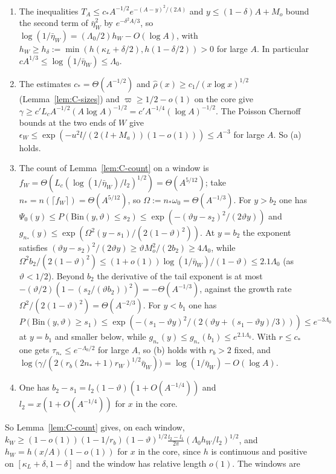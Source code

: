 \documentclass[10pt,letterpaper]{article}
\begin{document}
\begin{enumerate}
\item The inequalities $T_A\le c_*A^{-1/2}e^{-(A-y)^2/(2A)}$ and $y\le(1-\delta)A+M_o$ bound the second term of $\bar\eta_W^2$ by $e^{-\delta^2A/3}$,
so $\log(1/\bar\eta_W)=(\Lambda_0/2)h_W-O(\log A)$, with $h_W\ge h_\delta:=\min(h(\kappa_L+\delta/2),h(1-\delta/2))>0$ for large $A$. In
particular $cA^{1/3}\le\log(1/\bar\eta_W)\le\Lambda_0$.
\item The estimates $c_*=\Theta(A^{-1/2})$ and $\hat\rho(x)\ge c_1/(x\log x)^{1/2}$ (Lemma~\ref{lem:C-sizes}) and $\varpi\ge1/2-o(1)$ on the core give
$\gamma\ge c'L_cA^{-1/2}(A\log A)^{-1/2}=c'A^{-1/4}(\log A)^{-1/2}$. The Poisson Chernoff bounds at the two ends of $W$ give
$\epsilon_W\le\exp(-u^2l/(2(l+M_a))(1-o(1)))\le A^{-3}$ for large $A$. So (a) holds.
\item The count of Lemma~\ref{lem:C-count} on a window is $f_W=\Theta(L_c(\log(1/\bar\eta_W)/l_2)^{1/2})=\Theta(A^{5/12})$; take
$n_*=n(\lceil f_W\rceil)=\Theta(A^{5/12})$, so $\Omega:=n_*\omega_0=\Theta(A^{-1/3})$. For $y>b_2$ one has $\Psi_0(y)\le P(\mathrm{Bin}(y,\vartheta)\le s_2)\le\exp(-(\vartheta y-s_2)^2/(2\vartheta y))$ and
$g_{n_*}(y)\le\exp(\Omega^2(y-s_1)/(2(1-\vartheta)^2))$. At $y=b_2$ the exponent satisfies $(\vartheta y-s_2)^2/(2\vartheta y)\ge\vartheta M_o^2/(2b_2)\ge4\Lambda_0$,
while $\Omega^2b_2/(2(1-\vartheta)^2)\le(1+o(1))\log(1/\bar\eta_W)/(1-\vartheta)\le2.1\Lambda_0$ (as $\vartheta<1/2$). Beyond $b_2$ the
derivative of the tail exponent is at most $-(\vartheta/2)(1-(s_2/(\vartheta b_2))^2)=-\Theta(A^{-1/3})$, against the growth rate
$\Omega^2/(2(1-\vartheta)^2)=\Theta(A^{-2/3})$. For $y<b_1$ one has $P(\mathrm{Bin}(y,\vartheta)\ge s_1)\le\exp(-(s_1-\vartheta y)^2/(2(\vartheta y+(s_1-\vartheta y)/3)))\le e^{-3\Lambda_0}$ at $y=b_1$ and
smaller below, while $g_{n_*}(y)\le g_{n_*}(b_1)\le e^{2.1\Lambda_0}$. With $r\le c_*$ one gets $\tau_{n_*}\le e^{-\Lambda_0/2}$ for large $A$, so (b)
holds with $r_b>2$ fixed, and $\log\bigl(\gamma/(2(r_b(2n_*+1)r_W)^{1/2}\bar\eta_W)\bigr)=\log(1/\bar\eta_W)-O(\log A)$.
\item One has $b_2-s_1=l_2(1-\vartheta)(1+O(A^{-1/4}))$ and $l_2=x(1+O(A^{-1/4}))$ for $x$ in the core.
\end{enumerate}
So Lemma~\ref{lem:C-count} gives, on each window,
$k_W\ge(1-o(1))(1-1/r_b)(1-\vartheta)^{1/2}\frac{l_2-l_1}{2\pi}(\Lambda_0h_W/l_2)^{1/2}$, and $h_W=h(x/A)(1-o(1))$ for $x$ in the
core, since $h$ is continuous and positive on $[\kappa_L+\delta,1-\delta]$ and the window has relative length $o(1)$. The windows are
\end{document}
